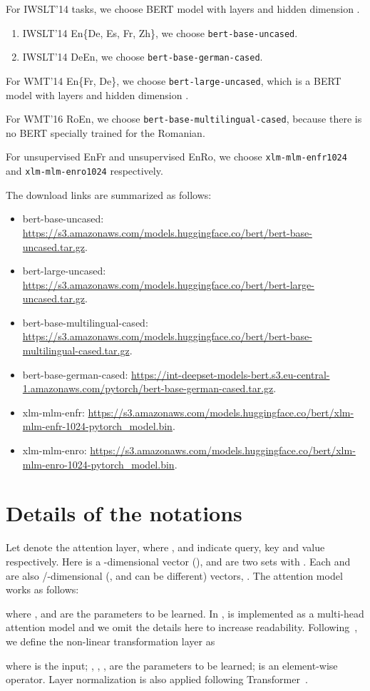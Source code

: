 \documentclass{article} \usepackage{iclr2020_conference,times}
\begin{document}
For IWSLT'14 tasks, we choose BERT model with  layers and hidden dimension .
\begin{enumerate}
\item IWSLT’14 En\{De, Es, Fr, Zh\}, we choose \texttt{bert-base-uncased}.
\item IWSLT’14 DeEn, we choose \texttt{bert-base-german-cased}.
\end{enumerate}
For WMT’14 En\{Fr, De\}, we choose \texttt{bert-large-uncased}, which is a BERT model with  layers and hidden dimension .

For WMT’16 RoEn, we choose \texttt{bert-base-multilingual-cased}, because there is no BERT specially trained for the Romanian. 

For unsupervised EnFr and unsupervised EnRo, we choose \texttt{xlm-mlm-enfr1024} and \texttt{xlm-mlm-enro1024} respectively.

The download links are summarized as follows:
\begin{itemize}
    \item bert-base-uncased: \url{https://s3.amazonaws.com/models.huggingface.co/bert/bert-base-uncased.tar.gz}.
    \item bert-large-uncased: \url{https://s3.amazonaws.com/models.huggingface.co/bert/bert-large-uncased.tar.gz}.
    \item bert-base-multilingual-cased: \url{https://s3.amazonaws.com/models.huggingface.co/bert/bert-base-multilingual-cased.tar.gz}.
    \item bert-base-german-cased: \url{https://int-deepset-models-bert.s3.eu-central-1.amazonaws.com/pytorch/bert-base-german-cased.tar.gz}.
    \item xlm-mlm-enfr: \url{https://s3.amazonaws.com/models.huggingface.co/bert/xlm-mlm-enfr-1024-pytorch_model.bin}.
    \item xlm-mlm-enro: \url{https://s3.amazonaws.com/models.huggingface.co/bert/xlm-mlm-enro-1024-pytorch_model.bin}.
\end{itemize}


\section{Details of the notations}\label{app:notation_details}
Let  denote the attention layer, where ,  and  indicate query, key and value respectively. Here  is a -dimensional vector (),  and  are two sets with . Each  and  are also /-dimensional (,  and  can be different) vectors, . The attention model works as follows:

where ,  and  are the parameters to be learned. In \citet{vaswani2017attention},  is implemented as a multi-head attention model and we omit the details here to increase readability. Following~\citet{vaswani2017attention}, we define the non-linear transformation layer as 

where  is the input; , , ,  are the parameters to be learned;  is an element-wise operator. Layer normalization is also applied following Transformer~\citep{vaswani2017attention}.
\end{document}
